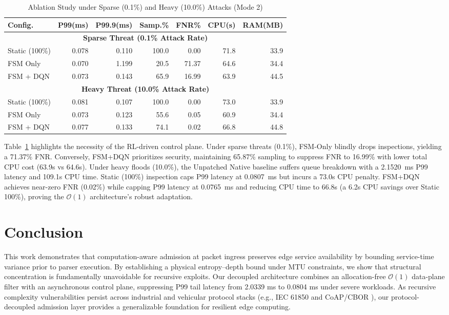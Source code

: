 \documentclass[conference]{IEEEtran}
\begin{document}
\begin{table}[ht]
\caption{Ablation Study under Sparse (0.1\%) and Heavy (10.0\%) Attacks (Mode 2)}
\label{tab:ablation}
\centering
\footnotesize
\setlength{\tabcolsep}{1.2pt}
\begin{tabular}{@{}lrrrrrr@{}}
\toprule
\textbf{Config.} & \textbf{P99(ms)} & \textbf{P99.9(ms)} & \textbf{Samp.\%} & \textbf{FNR\%} & \textbf{CPU(s)} & \textbf{RAM(MB)} \\
\midrule
\multicolumn{7}{c}{\textbf{Sparse Threat (0.1\% Attack Rate)}} \\
\midrule
Static (100\%) & 0.078 & 0.110 & 100.0 & 0.00 & 71.8 & 33.9 \\
FSM Only & 0.070 & 1.199 & 20.5 & 71.37 & 64.6 & 34.4 \\
FSM + DQN & 0.073 & 0.143 & 65.9 & 16.99 & 63.9 & 44.5 \\
\midrule
\multicolumn{7}{c}{\textbf{Heavy Threat (10.0\% Attack Rate)}} \\
\midrule
Static (100\%) & 0.081 & 0.107 & 100.0 & 0.00 & 73.0 & 33.9 \\
FSM Only & 0.073 & 0.123 & 55.6 & 0.05 & 60.9 & 34.4 \\
FSM + DQN & 0.077 & 0.133 & 74.1 & 0.02 & 66.8 & 44.8 \\
\bottomrule
\end{tabular}
\end{table}

Table~\ref{tab:ablation} highlights the necessity of the RL-driven control plane. Under sparse threats (0.1\%), FSM-Only blindly drops inspections, yielding a 71.37\% FNR. Conversely, FSM+DQN prioritizes security, maintaining 65.87\% sampling to suppress FNR to 16.99\% with lower total CPU cost (63.9s vs 64.6s). Under heavy floods (10.0\%), the Unpatched Native baseline suffers queue breakdown with a 2.1520~ms P99 latency and 109.1s CPU time. Static (100\%) inspection caps P99 latency at 0.0807~ms but incurs a 73.0s CPU penalty. FSM+DQN achieves near-zero FNR (0.02\%) while capping P99 latency at 0.0765~ms and reducing CPU time to 66.8s (a 6.2s CPU savings over Static 100\%), proving the $\mathcal{O}(1)$ architecture's robust adaptation.

\section{Conclusion}
This work demonstrates that computation-aware admission at packet ingress preserves edge service availability by bounding service-time variance prior to parser execution. By establishing a physical entropy--depth bound under MTU constraints, we show that structural concentration is fundamentally unavoidable for recursive exploits. Our decoupled architecture combines an allocation-free $\mathcal{O}(1)$ data-plane filter with an asynchronous control plane, suppressing P99 tail latency from 2.0339 ms to 0.0804 ms under severe workloads. As recursive complexity vulnerabilities persist across industrial and vehicular protocol stacks (e.g., IEC 61850 and CoAP/CBOR \cite{IEC61850_Goose_L2, noauthor_abstracts_2020}), our protocol-decoupled admission layer provides a generalizable foundation for resilient edge computing.



\end{document}
